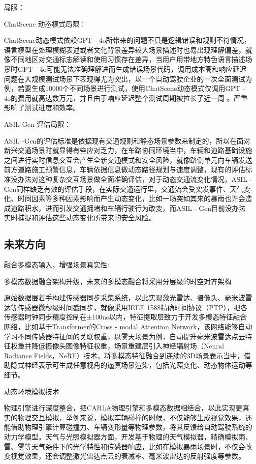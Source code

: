 局限：

ChatScene 动态模式局限：

ChatScene动态模式依赖GPT - 4o所带来的问题不只是逻辑错误和规则不符情况，语言模型在处理模糊表述或者文化背景差异较大场景描述时也易出现理解偏差，就像不同地区对交通标志解读和使用习惯存在差异，当用户用带地方特色语言描述场景时GPT - 4o可能无法准确理解进而生成错误场景代码，调用成本高和响应延迟问题在大规模测试场景下表现得尤为突出，以一个自动驾驶企业的一次全面测试为例，若要生成10000个不同场景进行测试，使用ChatScene动态模式仅调用GPT - 4o的费用就高达数万元，并且由于响应延迟整个测试周期被拉长了近一周 。严重影响了测试进度和效率。​


ASIL-Gen 评估局限：

ASIL -Gen的评估标准是依据现有交通规则和静态场景参数来制定的，所以在面对新兴交通场景时就显得有些应对乏力，在车路协同环境当中，车辆和道路基础设施之间进行实时信息交互会产生全新交通模式和安全风险，就像路侧单元向车辆发送前方道路施工预警信息，车辆依据信息做动态路径规划与速度调整，现有的评估标准没办法对这种复杂交互场景做全面准确评估，对于动态交通流变化情况，ASIL - Gen同样缺乏有效的评估手段，在实际交通运行里，交通流会受突发事件、天气变化、时间因素等多种因素影响而产生动态变化，比如一场突如其来的暴雨也许会造成道路积水，进而引发交通拥堵和车辆行驶行为改变，而ASIL - Gen目前没办法实时捕捉和评估这些动态变化所带来的安全风险。

\subsection{未来方向}

融合多模态输入，增强场景真实性:


多模态数据融合架构升级，未来的多模态融合将采用分层级的时空对齐架构

原始数据层着手构建传感器同步采集系统，以此实现激光雷达、摄像头、毫米波雷达等传感器微秒级时间戳同步，就像采用IEEE 1588精确时间协议（PTP），把各传感器时钟同步精度控制在±100ns以内，特征提取层致力于开发多模态特征融合网络，比如基于Transformer的Cross - modal Attention Network，该网络能够自动学习不同传感器特征间的关联权重，以雾天场景为例，自动提升毫米波雷达点云特征权重并降低摄像头图像特征权重，场景重建层引入神经辐射场（Neural Radiance Fields，NeRF）技术，将多模态特征融合到连续的3D场景表示当中，借助隐式神经表示可生成任意视角的逼真场景渲染，包括光照变化、动态物体运动等细节\cite{范云锋2019一种基于三次样条曲线的目标航迹拟合与插值方法研究}。


动态环境模拟技术

物理引擎进行深度整合，把CARLA物理引擎和多模态数据相结合，以此实现更真实的物理交互模拟，举例来说，模拟车辆碰撞的时候，不仅能够生成视觉效果，还能借助物理引擎计算碰撞力、车辆变形量等物理参数，将其反馈给自动驾驶系统的动力学模型。天气与光照模拟器方面，开发基于物理的天气模拟器，精确模拟雨、雪、雾等天气条件下的光学特性和传感器响应，比如在模拟暴雨场景时，不仅会改变视觉效果，还会调整激光雷达点云的衰减率、毫米波雷达的反射强度等参数。


